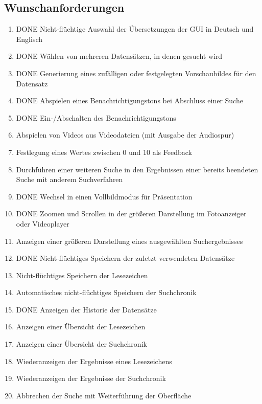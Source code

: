 \subsection{Wunschanforderungen}
\begin{enumerate} [label=\bfseries /FW \arabic*0/, leftmargin=*]
	\item DONE Nicht-flüchtige Auswahl der Übersetzungen der GUI in Deutsch und Englisch
	\newline
	\item DONE Wählen von mehreren Datensätzen, in denen gesucht wird
	\item DONE Generierung eines zufälligen oder festgelegten Vorschaubildes für den Datensatz
	\newline
	\item DONE Abspielen eines Benachrichtigungstons bei Abschluss einer Suche
	\item DONE Ein-/Abschalten des Benachrichtigungstons
	\item Abspielen von Videos aus Videodateien (mit Ausgabe der Audiospur)
	\newline
	\item Festlegung eines Wertes zwischen 0 und 10 als Feedback
	\item Durchführen einer weiteren Suche in den Ergebnissen einer bereits beendeten Suche mit anderem Suchverfahren
	\newline
	\item DONE Wechsel in einen Vollbildmodus für Präsentation
	\item DONE Zoomen und Scrollen in der größeren Darstellung im Fotoanzeiger oder Videoplayer
	\item Anzeigen einer größeren Darstellung eines ausgewählten Suchergebnisses
	\newline
	\item DONE Nicht-flüchtiges Speichern der zuletzt verwendeten Datensätze
	\item Nicht-flüchtiges Speichern der Lesezeichen
	\item Automatisches nicht-flüchtiges Speichern der Suchchronik
	\item DONE Anzeigen der Historie der Datensätze
	\item Anzeigen einer Übersicht der Lesezeichen
	\item Anzeigen einer Übersicht der Suchchronik
	\item Wiederanzeigen der Ergebnisse eines Lesezeichens
	\item Wiederanzeigen der Ergebnisse der Suchchronik
	\newline
	\item Abbrechen der Suche mit Weiterführung der Oberfläche
\end{enumerate}
\pagebreak
